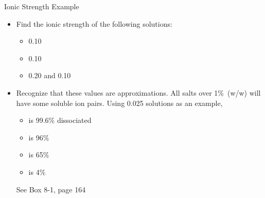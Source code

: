 \documentclass[notes=onlyslideswithnotes,notes=hide]{beamer}
\begin{document}
\begin{frame}{Ionic Strength Example}
	\begin{itemize}
		\item Find the ionic strength of the following solutions:
			\begin{itemize}
				\item \SI{0.10}{\Molar} 
				\item \SI{0.10}{\Molar} 
				\item \SI{0.20}{\Molar}  and
					\SI{0.10}{\Molar} 
			\end{itemize}
		\item Recognize that these values are approximations. All salts
			over 1\%~(w/w) will have some soluble ion pairs. Using
			\SI{0.025}{\formal} solutions as an example,
			\begin{itemize}
				\item {} is 99.6\% dissociated
				\item {} is 96\%
				\item {} is 65\%
				\item {} is 4\%
			\end{itemize}
			See Box 8-1, page 164
	\end{itemize}


\end{frame}
\end{document}
